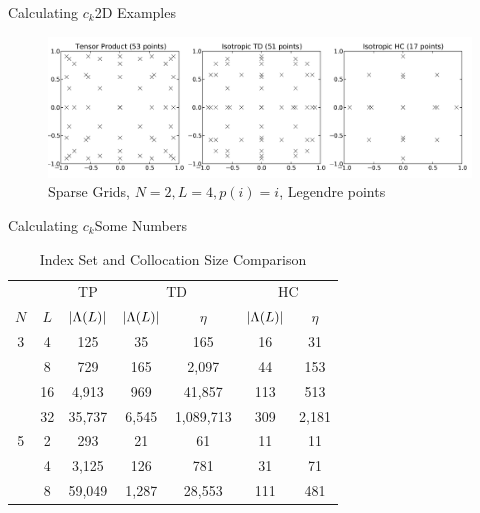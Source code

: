 \documentclass{beamer}
\begin{document}
\begin{frame}{Calculating $c_k$}{2D Examples}\normalsize\vspace{-20pt}
\begin{figure}[H]
\centering
  \includegraphics[width=\linewidth]{../graphics/jpgsparse}
  \caption{Sparse Grids, $N=2,L=4,p(i)=i$, Legendre points}
  \label{collsets}
\end{figure}
\end{frame}

\begin{frame}{Calculating $c_k$}{Some Numbers}\normalsize\vspace{-20pt}
\begin{table}
\centering
\begin{tabular}{c|c|c|c c|c c}
 &  & TP & \multicolumn{2}{|c|}{TD} & \multicolumn{2}{|c}{HC} \\ 
$N$ & $L$ & $\qty|\Lambda(L)|$ & $\qty|\Lambda(L)|$ & $\eta$ & $\qty|\Lambda(L)|$ & $\eta$\\ \hline
3 & 4 & 125    & 35    & 165   & 16 & 31\\
 & 8   & 729    & 165  & 2,097  & 44 & 153\\
 & 16 & 4,913  & 969   & 41,857 & 113 & 513\\
 & 32 & 35,737 & 6,545 & 1,089,713 & 309 & 2,181\\ \hline
5 & 2 & 293 & 21 & 61 & 11 & 11\\
 & 4 & 3,125 & 126 & 781 & 31 & 71\\
 & 8 & 59,049 & 1,287 & 28,553 & 111 & 481 
\end{tabular}
\caption{Index Set and Collocation Size Comparison}
\label{compIS}
\end{table}
\end{frame}
\end{document}
